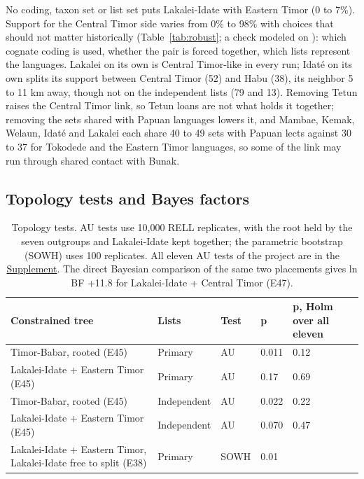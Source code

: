 \documentclass[11pt]{article}
\newcommand{\hd}[1]{\begin{minipage}[b]{\linewidth}\raggedright #1\end{minipage}}
\begin{document}
No coding, taxon set or list set puts Lakalei-Idate with Eastern Timor (0 to 7\%). Support for the Central Timor side varies from 0\% to 98\% with choices that should not matter historically (Table~\ref{tab:robust}; a check modeled on \citealt{kaiping2022}): which cognate coding is used, whether the pair is forced together, which lists represent the languages. Lakalei on its own is Central Timor-like in every run; Idaté on its own splits its support between Central Timor (52) and Habu (38), its neighbor 5 to 11 km away, though not on the independent lists (79 and 13). Removing Tetun raises the Central Timor link, so Tetun loans are not what holds it together; removing the sets shared with Papuan languages lowers it, and Mambae, Kemak, Welaun, Idaté and Lakalei each share 40 to 49 sets with Papuan lects against 30 to 37 for Tokodede and the Eastern Timor languages, so some of the link may run through shared contact with Bunak.

\subsection{Topology tests and Bayes factors}

\begin{table}[tbp]
\caption{Topology tests. AU tests \citep{shimodaira2002} use 10,000 RELL
replicates, with the root held by the seven outgroups and Lakalei-Idate
kept together; the parametric bootstrap (SOWH) uses 100 replicates. All
eleven AU tests of the project are in the \hyperref[supplement]{Supplement}. The direct
Bayesian comparison of the same two placements gives ln BF +11.8 for
Lakalei-Idate + Central Timor (E47).}
\label{tab:topology}
\begin{tabularx}{\linewidth}{@{}L{2.1}L{0.7}L{0.45}L{0.5}L{1.25}@{}}
\toprule
\hd{Constrained tree} & \hd{Lists} & \hd{Test} & \hd{p} & \hd{p, Holm over all eleven} \\
\midrule
Timor-Babar, rooted (E45) & Primary & AU & 0.011 & 0.12 \\
Lakalei-Idate + Eastern Timor (E45) & Primary & AU & 0.17 & 0.69 \\
Timor-Babar, rooted (E45) & Independent & AU & 0.022 & 0.22 \\
Lakalei-Idate + Eastern Timor (E45) & Independent & AU & 0.070 & 0.47 \\
Lakalei-Idate + Eastern Timor, Lakalei-Idate free to split (E38) & Primary & SOWH & 0.01 & \\
\bottomrule
\end{tabularx}
\end{table}
\end{document}
